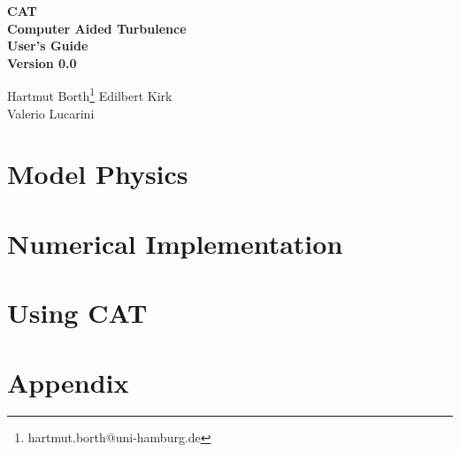 \documentclass[12pt,twoside,a4paper]{book}
\begin{document}
\begin{titlepage}
\begin{center}
\vspace*{3cm}
{\Huge\bf CAT} \\
\vspace*{0.5cm}
{\Huge\bf Computer Aided Turbulence} \\
\vspace*{1.5cm}
{\huge \bf User's Guide} \\
\vspace*{1cm}
{\huge \bf Version 0.0}
\vspace*{1cm}

{\large 
 Hartmut Borth\footnote{hartmut.borth@uni-hamburg.de} Edilbert Kirk 
                  \\
           Valerio Lucarini 
}

\end{center}
\end{titlepage}



\tableofcontents

\part{Model Physics}

 

\part{Numerical Implementation}

 

 

 

\part{Using CAT}

 
 
 

 

 

\part{Appendix}

\begin{appendix}

 

 
 
 

\end{appendix}



\begin{appendix}
\end{appendix}
\end{document}
